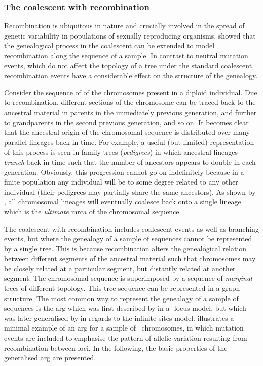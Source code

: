 %
\subsubsection{The coalescent with recombination}
%

Recombination is ubiquitous in nature and crucially involved in the spread of genetic variability in populations of sexually reproducing organisms.
 showed that the genealogical process in the coalescent can be extended to model recombination along the sequence of a sample.
In contrast to neutral mutation events, which do not affect the topology of a tree under the standard coalescent, recombination events have a considerable effect on the structure of the genealogy.

Consider the sequence of  of the chromosomes present in a diploid individual.
Due to recombination, different sections of the chromosome can be traced back to the ancestral material in  parents in the immediately previous generation, and further to  grandparents in the second previous generation, and so on.
It becomes clear that the ancestral origin of the chromosomal sequence is distributed over many parallel lineages back in time.
For example, a useful (but limited) representation of this process is seen in family trees (\emph{pedigrees}) in which ancestral lineages \emph{branch} back in time such that the number of ancestors appears to double in each generation.
Obviously, this progression cannot go on indefinitely because in a finite population any individual will be to some degree related to any other individual (their pedigrees may partially share the same ancestors).
As shown by \citet{Wiuf:1997wf}, all chromosomal lineages will eventually coalesce back onto a single lineage which is the \emph{ultimate} \gls{mrca} of the chromosomal sequence.

The coalescent with recombination includes coalescent events as well as branching events, but where the genealogy of a sample of sequences cannot be represented by a single tree.
This is because recombination alters the genealogical relation between different segments of the ancestral material such that  chromosomes may be closely related at a particular segment, but distantly related at another segment.
The chromosomal sequence is superimposed by a sequence of \emph{marginal} trees of different topology.
This tree sequence can be represented in a graph structure.
The most common way to represent the genealogy of a sample of sequences is the \gls{arg} which was first described by \citet{Griffiths:1991jp} in a -locus model, but which was later generalised by \citet{Griffiths:1996dx,griffiths1997} in regards to the infinite sites model.
 illustrates a minimal example of an \gls{arg} for a sample of ~chromosomes, in which mutation events are included to emphasise the pattern of allelic variation resulting from recombination between  loci.
In the following, the basic properties of the generalised \gls{arg} are presented.

